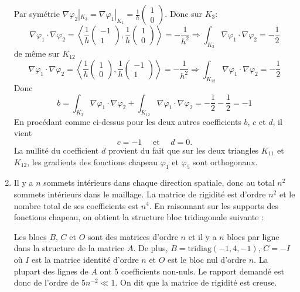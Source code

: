 \documentclass{article}
\begin{document}
\begin{enumerate}
Par symétrie $\nabla\varphi_2|_{K_3}=\nabla\varphi_1|_{K_1}=\frac{1}{h}\left(\begin{array}{c}1\\0 \end{array}\right)$. Donc sur $K_3$:
\[\nabla\varphi_1\cdot\nabla\varphi_2=\left<\frac 1h\left(\begin{array}{c}-1\\1 \end{array}\right),\frac 1h\left(\begin{array}{c}1\\0 \end{array}\right)\right>=-\frac{1}{h^2}\Longrightarrow \int_{K_3} \nabla\varphi_1\cdot\nabla\varphi_2 =-\frac 12\]
de même sur $K_{12}$
\[\nabla\varphi_1\cdot\nabla\varphi_2=\left<\frac 1h\left(\begin{array}{c}1\\0 \end{array}\right),\frac 1h\left(\begin{array}{c}-1\\1 \end{array}\right)\right>=-\frac{1}{h^2}\Longrightarrow \int_{K_{12}} \nabla\varphi_1\cdot\nabla\varphi_2 =-\frac 12\]
Donc
\[b=\int_{K_3} \nabla\varphi_1\cdot\nabla\varphi_2 + \int_{K_{12}} \nabla\varphi_1\cdot\nabla\varphi_2 =-\frac 12-\frac 12=-1\]
En procédant comme ci-dessus pour les deux autres coefficients $b$, $c$ et $d$, il vient
\[ c = -1\quad\mbox{ et }\quad d = 0.\]
La nullité du coefficient $d$ provient du fait que sur les deux triangles $K_{11}$ et $K_{12}$, les gradients des fonctions chapeau $\varphi_1$ et $\varphi_5$ sont orthogonaux.

\item Il y a $n$ sommets intérieurs dans chaque direction spatiale, donc au total $n^2$ sommets intérieurs dans le maillage. La matrice de rigidité est d'ordre $n^2$ et le nombre total de ses coefficients est $n^4$. En raisonnant sur les supports des fonctions chapeau, on obtient la structure bloc tridiagonale suivante :
\begin{center}
\end{center}
Les blocs $B$, $C$ et $O$ sont des matrices d'ordre $n$ et il y a $n$ blocs par ligne dans la structure de la matrice $A$. De plus, $B = \mbox{tridiag}(-1, 4, -1)$, $C = -I$ où $I$ est la matrice identité d'ordre
$n$ et $O$ est le bloc nul d'ordre $n$. La plupart des lignes de $A$ ont 5 coefficients non-nuls. Le rapport demandé est donc de l'ordre de $5n^{-2}\ll 1$. On dit que la matrice de rigidité est creuse.
\end{enumerate}
\end{document}
